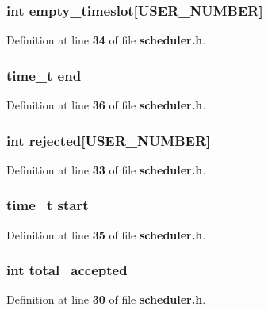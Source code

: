 \subsubsection[{empty\+\_\+timeslot}]{\setlength{\rightskip}{0pt plus 5cm}int empty\+\_\+timeslot[{\bf U\+S\+E\+R\+\_\+\+N\+U\+M\+B\+E\+R}]}\label{struct_summary_a743f7ce40fa79552b29c84b9eb8ae83e}


Definition at line {\bf 34} of file {\bf scheduler.\+h}.

\subsubsection[{end}]{\setlength{\rightskip}{0pt plus 5cm}time\+\_\+t end}\label{struct_summary_a13455ba845bf5d4dba37be491bc6a036}


Definition at line {\bf 36} of file {\bf scheduler.\+h}.

\subsubsection[{rejected}]{\setlength{\rightskip}{0pt plus 5cm}int rejected[{\bf U\+S\+E\+R\+\_\+\+N\+U\+M\+B\+E\+R}]}\label{struct_summary_a188091ffc3b85ad9af48f16c58e4733d}


Definition at line {\bf 33} of file {\bf scheduler.\+h}.

\subsubsection[{start}]{\setlength{\rightskip}{0pt plus 5cm}time\+\_\+t start}\label{struct_summary_ada310e7f72b38fadd4b24d80ed3438ee}


Definition at line {\bf 35} of file {\bf scheduler.\+h}.

\subsubsection[{total\+\_\+accepted}]{\setlength{\rightskip}{0pt plus 5cm}int total\+\_\+accepted}\label{struct_summary_a596d1da2837842b48f3a898a397698bd}


Definition at line {\bf 30} of file {\bf scheduler.\+h}.

